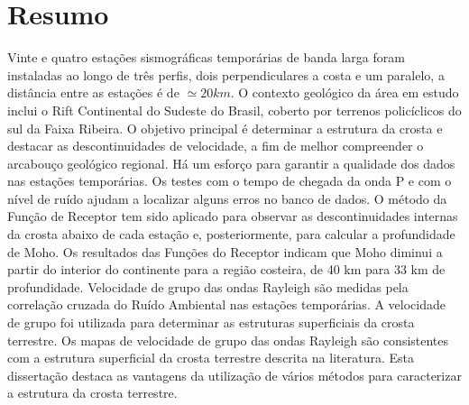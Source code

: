 \chapter*{Resumo}	

Vinte e quatro estações sismográficas temporárias de banda larga foram instaladas ao longo de três perfis, dois perpendiculares a costa e um paralelo, a distância entre as estações é de $\simeq 20 km$. O contexto geológico da área em estudo inclui o Rift Continental do Sudeste do Brasil, coberto por terrenos policíclicos do sul da Faixa Ribeira. O objetivo principal é determinar a estrutura da crosta e destacar as descontinuidades de velocidade, a fim de melhor compreender o arcabouço geológico regional. Há um esforço para garantir a qualidade dos dados nas estações temporárias. Os testes com o tempo de chegada da onda P e com o nível de ruído ajudam a localizar alguns erros no banco de dados. O método da Função de Receptor tem sido aplicado para observar as descontinuidades internas da crosta abaixo de cada estação e, posteriormente, para calcular a profundidade de Moho. Os resultados das Funções do Receptor indicam que Moho diminui a partir do interior do continente para a região costeira, de 40 km para 33 km de profundidade. Velocidade de grupo das ondas Rayleigh são medidas pela correlação cruzada do Ruído Ambiental nas estações temporárias. A velocidade de grupo foi utilizada para determinar as estruturas superficiais da crosta terrestre. Os mapas de velocidade de grupo das ondas Rayleigh são consistentes com a estrutura superficial da crosta terrestre descrita na literatura. Esta dissertação destaca as vantagens da utilização de vários métodos para caracterizar a estrutura da crosta terrestre.